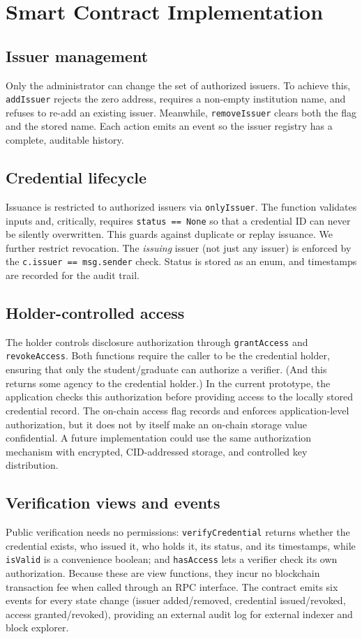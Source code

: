\documentclass[conference]{IEEEtran}
\begin{document}
\section{Smart Contract Implementation}

\subsection{Issuer management}
Only the administrator can change the set of authorized issuers. To achieve this, \texttt{addIssuer} rejects the zero address, requires a non-empty institution name, and refuses to re-add an existing issuer. Meanwhile, \texttt{removeIssuer} clears both the flag and the stored name. Each action emits an event so the issuer registry has a complete, auditable history.

\subsection{Credential lifecycle}
Issuance is restricted to authorized issuers via \texttt{onlyIssuer}. The function validates inputs and, critically, requires \texttt{status == None} so that a credential ID can never be silently overwritten. This guards against duplicate or replay issuance. We further restrict revocation. The \emph{issuing} issuer (not just any issuer) is enforced by the \texttt{c.issuer == msg.sender} check. Status is stored as an enum, and timestamps are recorded for the audit trail.

\subsection{Holder-controlled access}
The holder controls disclosure authorization through \verb|grantAccess| and \verb|revokeAccess|. Both functions require the caller to be the credential holder, ensuring that only the student/graduate can authorize a verifier. (And this returns some agency to the credential holder.) In the current prototype, the application checks this authorization before providing access to the locally stored credential record. The on-chain access flag records and enforces application-level authorization, but it does not by itself make an on-chain storage value confidential. A future implementation could use the same authorization mechanism with encrypted, CID-addressed storage, and controlled key distribution.

\subsection{Verification views and events}
Public verification needs no permissions: \texttt{verifyCredential} returns whether the credential exists, who issued it, who holds it, its status, and its timestamps, while \texttt{isValid} is a convenience boolean; and \texttt{hasAccess} lets a verifier check its own authorization.
Because these are view functions, they incur no blockchain transaction fee when called through an RPC interface. The contract emits six events for every state change (issuer added/removed, credential issued/revoked, access granted/revoked), providing an external audit log for external indexer and block explorer.
\end{document}

